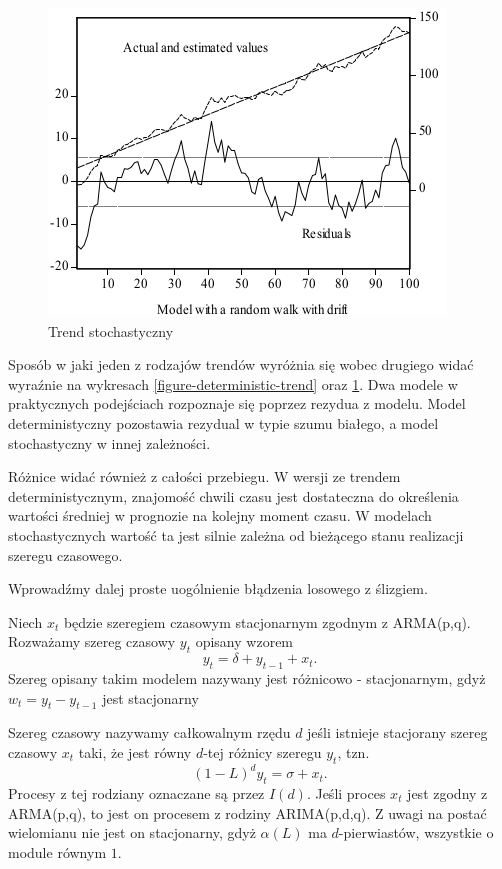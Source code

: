 \documentclass[10pt,a4paper]{book}
\begin{document}
\begin{figure}
\centering
\includegraphics[scale=1]{images/stochastic_trend_residuas.png}
\caption{Trend stochastyczny}
\label{figure-stochastic-trend}
\end{figure}

Sposób w jaki jeden z rodzajów trendów wyróżnia się wobec drugiego widać wyraźnie na wykresach
\ref{figure-deterministic-trend} oraz \ref{figure-stochastic-trend}. Dwa modele w praktycznych podejściach rozpoznaje się poprzez rezydua z modelu. Model deterministyczny pozostawia rezydual w typie szumu białego, a model stochastyczny w innej zależności.

Różnice widać również z całości przebiegu. W wersji ze trendem deterministycznym, znajomość chwili czasu jest dostateczna do określenia wartości średniej w prognozie na kolejny moment czasu. W modelach stochastycznych wartość ta jest silnie zależna od bieżącego stanu realizacji szeregu czasowego.

Wprowadźmy dalej proste uogólnienie błądzenia losowego z ślizgiem. 

\begin{remark}
Niech $x_t$ będzie szeregiem czasowym stacjonarnym zgodnym z ARMA(p,q). Rozważamy szereg czasowy $y_t$ opisany wzorem
$$
y_t = \delta + y_{t-1} + x_t.
$$
Szereg opisany takim modelem nazywany jest różnicowo - stacjonarnym, gdyż $w_t = y_t - y_{t-1}$ jest stacjonarny
\end{remark}

\begin{definition}
Szereg czasowy nazywamy całkowalnym rzędu $d$ jeśli istnieje stacjorany szereg czasowy $x_t$ taki, że jest równy $d$-tej różnicy szeregu $y_t$, tzn.
$$
(1-L)^d y_t = \sigma + x_t.
$$
Procesy z tej rodziany oznaczane są przez $I(d)$. Jeśli proces $x_t$ jest zgodny z ARMA(p,q), to jest on procesem z rodziny ARIMA(p,d,q). Z uwagi na postać wielomianu nie jest on stacjonarny, gdyż $\alpha(L)$ ma $d$-pierwiastów, wszystkie o module równym $1$.  
\end{definition}
\end{document}
